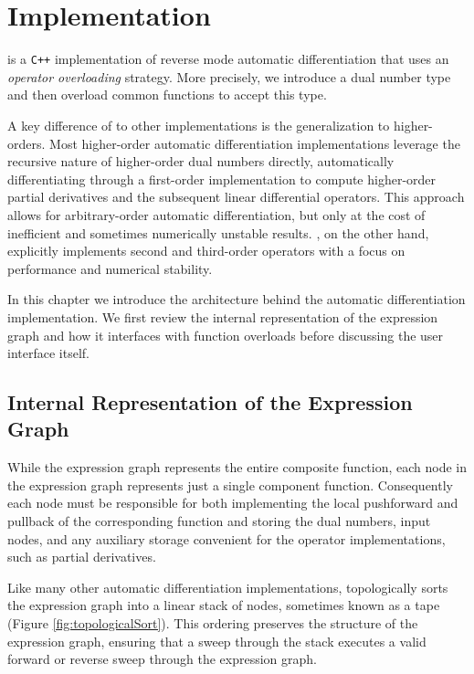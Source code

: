 \chapter{Implementation}
\label{chp:implementation}

\nomad is a \verb|C++| implementation of reverse mode automatic
differentiation that uses an \textit{operator overloading} strategy.
More precisely, we introduce a dual number type and then overload
common functions to accept this type.

A key difference of \nomad to other implementations is the generalization
to higher-orders.  Most higher-order automatic differentiation
implementations leverage the recursive nature of higher-order dual
numbers directly, automatically differentiating through a first-order
implementation to compute higher-order partial derivatives and
the subsequent linear differential operators.  This approach allows for
arbitrary-order automatic differentiation, but only at the cost of inefficient and 
sometimes numerically unstable results.  \nomad,
on the other hand, explicitly implements second and third-order operators
with a focus on performance and numerical stability.

In this chapter we introduce the architecture behind the \nomad automatic 
differentiation implementation.  We first review the internal representation 
of the expression graph and how it interfaces with function overloads before
discussing the user interface itself.

\section{Internal Representation of the Expression Graph}
\label{sec:exp_graph_rep}

While the expression graph represents the entire composite function, each
node in the expression graph represents just a single component function.  
Consequently each node must be responsible for both implementing the 
local pushforward and pullback of the corresponding function and storing 
the dual numbers, input nodes, and any auxiliary storage convenient for 
the operator implementations, such as partial derivatives.
 
Like many other automatic differentiation implementations, \nomad
topologically sorts the expression graph into a linear stack of nodes, 
sometimes known as a tape (Figure \ref{fig:topologicalSort}).  This ordering 
preserves the structure of the expression graph, ensuring that a sweep 
through the stack executes a valid forward or reverse sweep through the 
expression graph.

